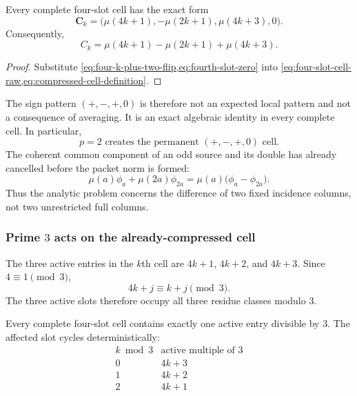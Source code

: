 \begin{theorem}
\label{thm:exact-cell-compression}
Every complete four-slot cell has the exact form
\begin{equation}
 \boxed{
 \mathbf C_k
 =\bigl(
   \mu(4k+1),
   -\mu(2k+1),
   \mu(4k+3),
   0
  \bigr).
 }
 \label{eq:four-slot-cell-exact}
\end{equation}
Consequently,
\begin{equation}
 \boxed{
 C_k
 =\mu(4k+1)-\mu(2k+1)+\mu(4k+3).
 }
 \label{eq:compressed-cell-exact}
\end{equation}
\end{theorem}

\begin{proof}
Substitute \cref{eq:four-k-plus-two-flip,eq:fourth-slot-zero} into
\cref{eq:four-slot-cell-raw,eq:compressed-cell-definition}.
\end{proof}

The sign pattern $(+,-,+,0)$ is therefore not an expected local pattern and
not a consequence of averaging.  It is an exact algebraic identity in every
complete cell.  In particular,
\begin{equation}
 \boxed{
 p=2\text{ creates the permanent }(+,-,+,0)\text{ cell}.
 }
 \label{eq:p2-creates-cell}
\end{equation}
The coherent common component of an odd source and its double has already
cancelled before the packet norm is formed:
\begin{equation}
 \mu(a)\phi_a+\mu(2a)\phi_{2a}
 =\mu(a)\bigl(\phi_a-\phi_{2a}\bigr).
 \label{eq:doubling-column-difference}
\end{equation}
Thus the analytic problem concerns the difference of two fixed incidence
columns, not two unrestricted full columns.

\subsubsection{Prime $3$ acts on the already-compressed cell}

The three active entries in the $k$th cell are $4k+1$, $4k+2$, and $4k+3$.
Since $4\equiv1\pmod3$,
\begin{equation}
 4k+j\equiv k+j\pmod3.
 \label{eq:p3-cell-residues}
\end{equation}
The three active slots therefore occupy all three residue classes modulo $3$.

\begin{theorem}
\label{thm:universal-prime-three-activation}
Every complete four-slot cell contains exactly one active entry divisible by
$3$.  The affected slot cycles deterministically:
\begin{equation}
\begin{array}{c|c}
 k\bmod3 & \text{active multiple of }3\\
 \hline
 0 & 4k+3\\
 1 & 4k+2\\
 2 & 4k+1
\end{array}
\label{eq:p3-slot-cycle}
\end{equation}
\end{theorem}


